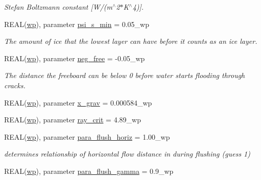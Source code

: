 \begin{DoxyCompactItemize}
\begin{DoxyCompactList}\small\item\em Stefan Boltzmann constant \mbox{[}W/(m$^\wedge$2$\ast$K$^\wedge$4)\mbox{]}. \item\end{DoxyCompactList}\item 
REAL(\hyperlink{namespacemo__parameters_a41be20bed1dcec244405328deaaffe30}{wp}), parameter \hyperlink{namespacemo__parameters_a220395b5fd47214fbb07e7e55c635e4f}{psi\_\-s\_\-min} = 0.05\_\-wp
\begin{DoxyCompactList}\small\item\em The amount of ice that the lowest layer can have before it counts as an ice layer. \item\end{DoxyCompactList}\item 
REAL(\hyperlink{namespacemo__parameters_a41be20bed1dcec244405328deaaffe30}{wp}), parameter \hyperlink{namespacemo__parameters_ad1d58450590f138e7d1116327f563f30}{neg\_\-free} = -\/0.05\_\-wp
\begin{DoxyCompactList}\small\item\em The distance the freeboard can be below 0 before water starts flooding through cracks. \item\end{DoxyCompactList}\item 
REAL(\hyperlink{namespacemo__parameters_a41be20bed1dcec244405328deaaffe30}{wp}), parameter \hyperlink{namespacemo__parameters_a8dd2eb8edab23a209cecbca50873fb83}{x\_\-grav} = 0.000584\_\-wp
\item 
REAL(\hyperlink{namespacemo__parameters_a41be20bed1dcec244405328deaaffe30}{wp}), parameter \hyperlink{namespacemo__parameters_a5f8c574464740cb0fa35f52e8382500d}{ray\_\-crit} = 4.89\_\-wp
\item 
REAL(\hyperlink{namespacemo__parameters_a41be20bed1dcec244405328deaaffe30}{wp}), parameter \hyperlink{namespacemo__parameters_af4be8b247f00cf308e1974266c326fdd}{para\_\-flush\_\-horiz} = 1.00\_\-wp
\begin{DoxyCompactList}\small\item\em determines relationship of horizontal flow distance in during flushing (guess 1) \item\end{DoxyCompactList}\item 
REAL(\hyperlink{namespacemo__parameters_a41be20bed1dcec244405328deaaffe30}{wp}), parameter \hyperlink{namespacemo__parameters_a15fb04a55119c8da15569d72bc5cf370}{para\_\-flush\_\-gamma} = 0.9\_\-wp

\end{DoxyCompactItemize}
